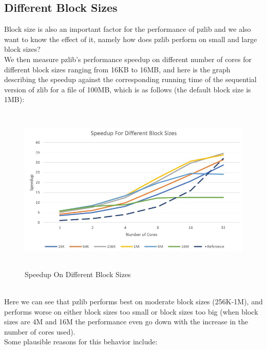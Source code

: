 \documentclass[12pt]{article}
\begin{document}
    \subsection{Different Block Sizes}
    Block size is also an important factor for the performance of pzlib and we also want to know the effect of it, namely how does pzlib perform on small and large block sizes?\\
    We then measure pzlib's performance speedup on different number of cores for different block sizes ranging from 16KB to 16MB, and here is the graph describing the speedup against the corresponding running time of the sequential version of zlib for a file of 100MB, which is as follows (the default block size is 1MB):
    \begin{figure}[!h]
    \begin{center}
    \includegraphics[height=8cm]{SpeedupBlocksizes.JPG}
    \caption{Speedup On Different Block Sizes}
    \end{center}
    \end{figure}
    ~\\
    Here we can see that pzlib performs best on moderate block sizes (256K-1M), and performs worse on either block sizes too small or block sizes too big (when block sizes are 4M and 16M the performance even go down with the increase in the number of cores used).\\
    Some plausible reasons for this behavior include:
\end{document}
